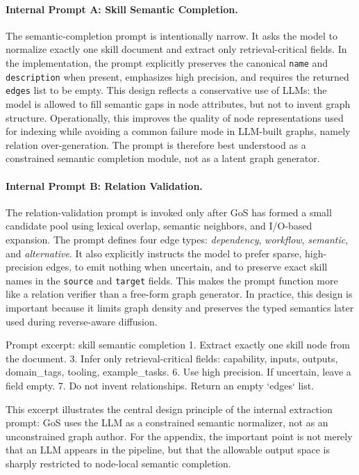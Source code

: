 \paragraph{Internal Prompt A: Skill Semantic Completion.}
The semantic-completion prompt is intentionally narrow. It asks the model to normalize exactly one skill document and extract only retrieval-critical fields. In the implementation, the prompt explicitly preserves the canonical \texttt{name} and \texttt{description} when present, emphasizes high precision, and requires the returned \texttt{edges} list to be empty. This design reflects a conservative use of LLMs: the model is allowed to fill semantic gaps in node attributes, but not to invent graph structure. Operationally, this improves the quality of node representations used for indexing while avoiding a common failure mode in LLM-built graphs, namely relation over-generation. The prompt is therefore best understood as a constrained semantic completion module, not as a latent graph generator.

\paragraph{Internal Prompt B: Relation Validation.}
The relation-validation prompt is invoked only after GoS has formed a small candidate pool using lexical overlap, semantic neighbors, and I/O-based expansion. The prompt defines four edge types: \emph{dependency}, \emph{workflow}, \emph{semantic}, and \emph{alternative}. It also explicitly instructs the model to prefer sparse, high-precision edges, to emit nothing when uncertain, and to preserve exact skill names in the \texttt{source} and \texttt{target} fields. This makes the prompt function more like a relation verifier than a free-form graph generator. In practice, this design is important because it limits graph density and preserves the typed semantics later used during reverse-aware diffusion.

\begin{GosPromptBox}{Prompt excerpt: skill semantic completion}
1. Extract exactly one skill node from the document.
3. Infer only retrieval-critical fields: capability, inputs,
   outputs, domain_tags, tooling, example_tasks.
6. Use high precision. If uncertain, leave a field empty.
7. Do not invent relationships. Return an empty `edges` list.
\end{GosPromptBox}

This excerpt illustrates the central design principle of the internal extraction prompt: GoS uses the LLM as a constrained semantic normalizer, not as an unconstrained graph author. For the appendix, the important point is not merely that an LLM appears in the pipeline, but that the allowable output space is sharply restricted to node-local semantic completion.

